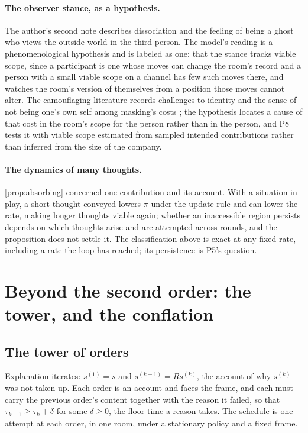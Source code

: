 \paragraph{The observer stance, as a hypothesis.} The author's second note describes dissociation and the feeling of being a ghost who views the outside world in the third person. The model's reading is a phenomenological hypothesis and is labeled as one: that the stance tracks viable scope, since a participant is one whose moves can change the room's record and a person with a small viable scope on a channel has few such moves there, and watches the room's version of themselves from a position those moves cannot alter. The camouflaging literature records challenges to identity and the sense of not being one's own self among masking's costs \cite{Hull2017, Cage2019}; the hypothesis locates a cause of that cost in the room's scope for the person rather than in the person, and P8 tests it with viable scope estimated from sampled intended contributions rather than inferred from the size of the company.

\paragraph{The dynamics of many thoughts.} \autoref{prop:absorbing} concerned one contribution and its account. With a situation in play, a short thought conveyed lowers $\pi$ under the update rule and can lower the rate, making longer thoughts viable again; whether an inaccessible region persists depends on which thoughts arise and are attempted across rounds, and the proposition does not settle it. The classification above is exact at any fixed rate, including a rate the loop has reached; its persistence is P5's question.

\section{Beyond the second order: the tower, and the conflation}\label{sec:tower}

\subsection{The tower of orders}

Explanation iterates: $s^{(1)} = s$ and $s^{(k+1)} = Rs^{(k)}$, the account of why $s^{(k)}$ was not taken up. Each order is an account and faces the frame, and each must carry the previous order's content together with the reason it failed, so that $\tau_{k+1} \ge \tau_k + \delta$ for some $\delta \ge 0$, the floor time a reason takes. The schedule is one attempt at each order, in one room, under a stationary policy and a fixed frame.

